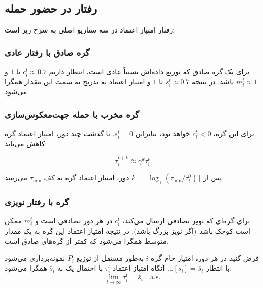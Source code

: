 \subsection{رفتار در حضور حمله}

رفتار امتیاز اعتماد در سه سناریو اصلی به شرح زیر است:

\subsubsection{گره صادق با رفتار عادی}

برای یک گره صادق که توزیع داده‌اش نسبتاً عادی است، انتظار داریم $c_i^t \approx 0.7$ تا $1$ و $m_i^t \approx 1$ باشد. در نتیجه $s_i^t \approx 0.7$ تا $1$ و امتیاز اعتماد به تدریج به سمت این مقدار همگرا می‌شود.

\subsubsection{گره مخرب با حمله جهت‌معکوس‌سازی}

برای این گره، $c_i^t < 0$ خواهد بود، بنابراین $s_i^t = 0$. با گذشت چند دور، امتیاز اعتماد گره کاهش می‌یابد:

\begin{equation}
    \tau_i^{t+k} \approx \gamma^k \tau_i^t
    \label{eq:trust_decay}
\end{equation}

پس از $k = \lceil \log_\gamma(\tau_{\min} / \tau_i^0) \rceil$ دور، امتیاز اعتماد گره به کف $\tau_{\min}$ می‌رسد.

\subsubsection{گره با رفتار نویزی}

برای گره‌ای که نویز تصادفی ارسال می‌کند، $c_i^t$ در هر دور تصادفی است و $m_i^t$ ممکن است کوچک باشد (اگر نویز بزرگ باشد). در نتیجه امتیاز اعتماد این گره به یک مقدار متوسط همگرا می‌شود که کمتر از گره‌های صادق است.

\begin{nttheorem}
\label{theorem:convergence_trust}
    فرض کنید در هر دور، امتیاز خام گره $i$ به‌طور مستقل از توزیع $P_i$ نمونه‌برداری می‌شود با انتظار $\mathbb{E}[s_i] = \bar{s}_i$. آنگاه امتیاز اعتماد $\tau_i^t$ با احتمال یک به $\bar{s}_i$ همگرا می‌شود:
    \begin{equation}
        \lim_{t \to \infty} \tau_i^t = \bar{s}_i \quad \text{a.s.}
        \label{eq:trust_convergence}
    \end{equation}
\end{nttheorem}

